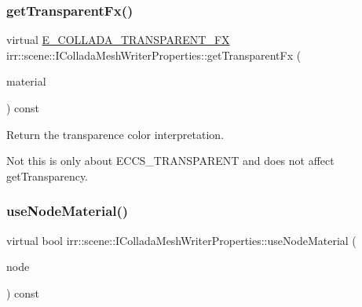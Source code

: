\subsubsection{\texorpdfstring{get\+Transparent\+Fx()}{getTransparentFx()}\hspace{0.1cm}{\footnotesize\ttfamily [2/2]}}
{\footnotesize\ttfamily virtual \hyperlink{namespaceirr_1_1scene_af7dadd5b96b683cfe1800f343c4f6619}{E\+\_\+\+C\+O\+L\+L\+A\+D\+A\+\_\+\+T\+R\+A\+N\+S\+P\+A\+R\+E\+N\+T\+\_\+\+FX} irr\+::scene\+::\+I\+Collada\+Mesh\+Writer\+Properties\+::get\+Transparent\+Fx (\begin{DoxyParamCaption}\item[{const \hyperlink{classirr_1_1video_1_1SMaterial}{video\+::\+S\+Material} \&}]{material }\end{DoxyParamCaption}) const\hspace{0.3cm}{\ttfamily [pure virtual]}}



Return the transparence color interpretation. 

Not this is only about E\+C\+C\+S\+\_\+\+T\+R\+A\+N\+S\+P\+A\+R\+E\+NT and does not affect get\+Transparency. \mbox{\label{classirr_1_1scene_1_1IColladaMeshWriterProperties_a9c10df4dc3602efbba6a47b34e2f8f4b}} 
\subsubsection{\texorpdfstring{use\+Node\+Material()}{useNodeMaterial()}\hspace{0.1cm}{\footnotesize\ttfamily [1/2]}}
{\footnotesize\ttfamily virtual bool irr\+::scene\+::\+I\+Collada\+Mesh\+Writer\+Properties\+::use\+Node\+Material (\begin{DoxyParamCaption}\item[{const \hyperlink{classirr_1_1scene_1_1ISceneNode}{scene\+::\+I\+Scene\+Node} $\ast$}]{node }\end{DoxyParamCaption}) const\hspace{0.3cm}{\ttfamily [pure virtual]}}



